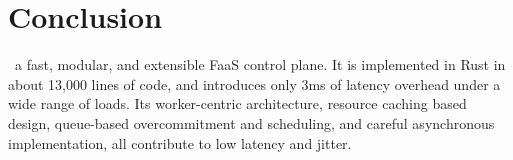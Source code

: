 


\begin{comment}
  \section{Discussion}
There are a number of open-sourced FaaS platforms out there now, so why do we feel the need to make and release yet another?
Nearly all the platforms out there are targeted at end users of FaaS, not built with researchers in mind.
The only one to break this trend is OpenLambda~\cite{hendrickson2016serverless}.
We find it insufficient as it is implemented in Go, whose garbage collection we feel is a significant issue in the latency critical environment of FaaS.
Importantly it lacks both the ability to operate as a cluster and an integrated load generation system, both of which we have implemented both in \sysname~.

OpenFaas~\cite{openfaas} and nuclio~\cite{nuclio} both rely on Docker/Kubernetes as their deployment and scaling mechanisms.
These existing tech stacks are highly useful, but limit the research possibilities of a platform, e.g. cold start optimizations and deploying to edge nodes become intractable.
While \sysname~does have a Docker implementation, it is to showcase the ability implement multiple containerization mechanisms and compare between them.

OpenWhisk~\cite{openwhisk} also relies on a Docker/Kubernetes setup, and has we have shown above has highly unpredictable performance.
The JVM garbage collection, plus high latency variance coming from both their custom platform pieces and third-party CouchDB and Kafka detract from its capability as a research platform.
We have eliminated the third party services from the invocation path, and our design and Rust implementation contribute to the low-overhead low-variance of the platform.
\end{comment}

\section{Conclusion}
\sysname~a fast, modular, and extensible FaaS control plane. 
It is implemented in Rust in about 13,000 lines of code, and introduces only 3ms of latency overhead under a wide range of loads.
Its worker-centric architecture, resource caching based design, queue-based overcommitment and scheduling, and careful asynchronous implementation, all contribute to low latency and jitter. 

